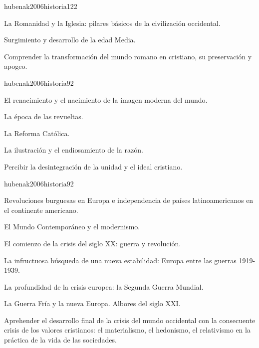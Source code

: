 \begin{syllabus}
\begin{unit}{}{hubenak2006historia}{12}{2}
\begin{topics}
	\item La Romanidad y la Iglesia: pilares básicos de la civilización occidental. 	
	\item Surgimiento y desarrollo de la edad Media.
\end{topics}
\begin{learningoutcomes}
	\item Comprender la transformación del mundo romano en cristiano, su preservación y apogeo.
\end{learningoutcomes}
\end{unit}

\begin{unit}{}{hubenak2006historia}{9}{2}
\begin{topics}
	\item El renacimiento y el nacimiento de la imagen moderna del mundo.  	
	\item La época de las revueltas. 	
	\item La Reforma Católica. 	
	\item La ilustración y el endiosamiento de la razón. 
\end{topics}
\begin{learningoutcomes}
	\item Percibir la desintegración de la unidad y el ideal cristiano.
\end{learningoutcomes}
\end{unit}

\begin{unit}{}{hubenak2006historia}{9}{2}
\begin{topics}
	\item Revoluciones burguesas en Europa e independencia de países latinoamericanos en el continente americano. 	
	\item El Mundo Contemporáneo y el modernismo. 	
	\item El comienzo de la crisis del siglo XX: guerra y revolución. 	
	\item La infructuosa búsqueda de una nueva estabilidad: Europa entre las guerras 1919-1939. 	
	\item La profundidad de la crisis europea: la Segunda Guerra Mundial. 	
	\item La Guerra Fría y la nueva Europa. Albores del siglo XXI.
\end{topics}
\begin{learningoutcomes}
	\item Aprehender el desarrollo final de la crisis del mundo occidental con la consecuente crisis de los valores cristianos: el materialismo, el hedonismo, el relativismo en la práctica de la vida de las sociedades. 
\end{learningoutcomes}
\end{unit}


\end{syllabus}
